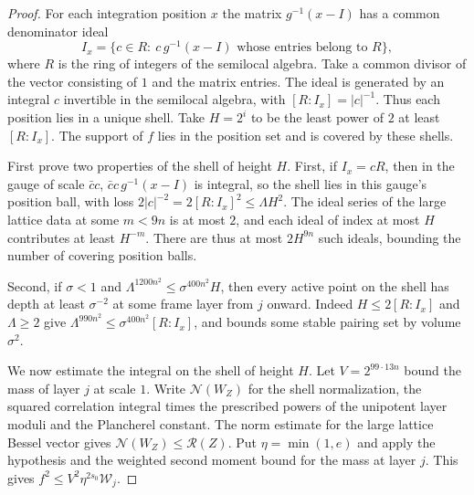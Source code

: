 \begin{proof}
For each integration position $x$ the matrix $g^{-1}(x-I)$ has a common denominator ideal
\[
 I_x=\{c\in R:\ c\,g^{-1}(x-I)\text{ whose entries belong to }R\},
\]
where $R$ is the ring of integers of the semilocal algebra.
Take a common divisor of the vector consisting of $1$ and the matrix entries.
The ideal is generated by an integral $c$ invertible in the semilocal algebra,
with $[R:I_x]=|c|^{-1}$. Thus each position lies in a unique shell.
Take $H=2^i$ to be the least power of $2$ at least $[R:I_x]$.
The support of $f$ lies in the position set and is covered by these shells.

First prove two properties of the shell of height $H$.
First, if $I_x=cR$, then in the gauge of scale $\bar c c$,
$\bar c c\,g^{-1}(x-I)$ is integral, so the shell lies in this gauge's position ball,
with loss $2|c|^{-2}=2[R:I_x]^2\le\Lambda H^2$.
The ideal series of the large lattice data at some $m<9n$ is at most $2$,
and each ideal of index at most $H$ contributes at least $H^{-m}$.
There are thus at most $2H^{9n}$ such ideals, bounding the number of covering position balls.

Second, if $\sigma<1$ and
$\Lambda^{1200n^2}\le \sigma^{400n^2}H$,
then every active point on the shell has depth at least $\sigma^{-2}$ at some frame layer from $j$ onward.
Indeed $H\le2[R:I_x]$ and $\Lambda\ge2$ give
$\Lambda^{990n^2}\le \sigma^{400n^2}[R:I_x]$,
and  bounds some stable pairing set by volume $\sigma^2$.

We now estimate the integral on the shell of height $H$.
Let $V=2^{99\cdot 13 n}$ bound the mass of layer $j$ at scale $1$.
Write $\mathcal N(W_Z)$ for the shell normalization, the squared correlation integral times
the prescribed powers of the unipotent layer moduli and the Plancherel constant.
The norm estimate for the large lattice Bessel vector gives $\mathcal N(W_Z)\le\mathcal R(Z)$.
Put $\eta=\min(1,e)$ and apply the hypothesis and the weighted second moment bound for the mass at layer $j$.
This gives $f^2\le V^2\eta^{2s_0}\mathcal W_j$.


\end{proof}
